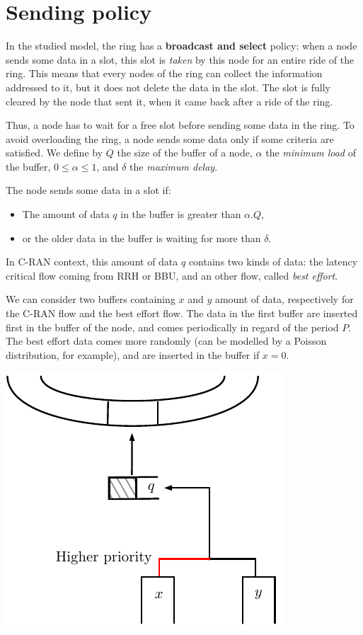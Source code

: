 \documentclass[a4paper,10pt]{article}
\begin{document}
\section*{Sending policy}
In the studied model, the ring has a {\bf broadcast and select} policy: when a node sends some data in a slot, this slot is {\em taken} by this node for an entire ride of the ring. This means that every nodes of the ring can collect the information addressed to it, but it does not delete the data in the slot. The slot is fully cleared by the node that sent it, when it came back after a ride of the ring.

Thus, a node has to wait for a free slot before sending some data in the ring. To avoid overloading the ring, a node sends some data only if some criteria  are satisfied.
We define by $Q$ the size of the buffer of a node, $\alpha$ the {\em minimum load} of the buffer, $0 \leq  \alpha \leq 1$, and $\delta$ the {\em maximum delay}.

The node sends some data in a slot if:
\begin{itemize}
 \item The amount of data $q$ in the buffer is greater than $\alpha . Q$,
 \item or the older data in the buffer is waiting for more than $\delta$.
\end{itemize}

In C-RAN context, this amount of data $q$ contains two kinds of data: the latency critical flow coming from RRH or BBU, and an other flow, called {\em best effort}.

We can consider two buffers containing $x$ and $y$ amount of data, respectively for the C-RAN flow and the best effort flow.
The data in the first buffer are inserted first in the buffer of the node, and comes periodically in regard of the period $P$. 
The best effort data comes more randomly (can be modelled by a Poisson distribution, for example), and are inserted in the buffer if $x = 0$.

\begin{center}   

      \includegraphics[scale=0.7]{insertion.pdf}

  
\end{center}
\end{document}
